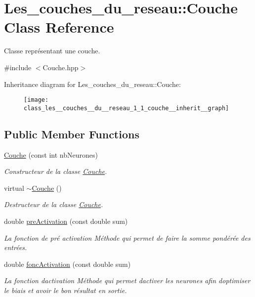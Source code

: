 \hypertarget{class_les__couches__du__reseau_1_1_couche}{}\section{Les\+\_\+couches\+\_\+du\+\_\+reseau\+:\+:Couche Class Reference}
\label{class_les__couches__du__reseau_1_1_couche}


Classe représentant une couche.  




{\ttfamily \#include $<$Couche.\+hpp$>$}



Inheritance diagram for Les\+\_\+couches\+\_\+du\+\_\+reseau\+:\+:Couche\+:\nopagebreak
\begin{figure}[H]
\begin{center}
\leavevmode
\texttt{[image: class\_les\_\_couches\_\_du\_\_reseau\_1\_1\_couche\_\_inherit\_\_graph]}
\end{center}
\end{figure}
\subsection*{Public Member Functions}
\begin{DoxyCompactItemize}
\item 
\hyperlink{class_les__couches__du__reseau_1_1_couche_af564932d3de118cead9fcc504e237285}{Couche} (const int nb\+Neurones)
\begin{DoxyCompactList}\small\item\em Constructeur de la classe \hyperlink{class_les__couches__du__reseau_1_1_couche}{Couche}. \end{DoxyCompactList}\item 
virtual \hyperlink{class_les__couches__du__reseau_1_1_couche_ad6b0be0bb3de03b0364a23cd64cfc052}{$\sim$\+Couche} ()
\begin{DoxyCompactList}\small\item\em Destructeur de la classe \hyperlink{class_les__couches__du__reseau_1_1_couche}{Couche}. \end{DoxyCompactList}\item 
double \hyperlink{class_les__couches__du__reseau_1_1_couche_aee74a863eca708b4271ca2f35d24ab9b}{pre\+Activation} (const double sum)
\begin{DoxyCompactList}\small\item\em La fonction de pré activation Méthode qui permet de faire la somme pondérée des entrées. \end{DoxyCompactList}\item 
double \hyperlink{class_les__couches__du__reseau_1_1_couche_a9b51a1bfb515f466695e1f512da418e6}{fonc\+Activation} (const double sum)
\begin{DoxyCompactList}\small\item\em La fonction d\textquotesingle{}activation Méthode qui permet d\textquotesingle{}activer les neurones afin d\textquotesingle{}optimiser le biais et avoir le bon résultat en sortie. \end{DoxyCompactList}\end{DoxyCompactItemize}


